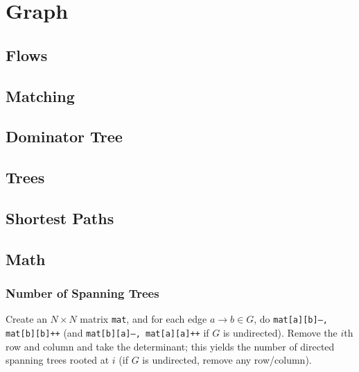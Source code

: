 \chapter{Graph}

\section{Flows}

\section{Matching}

\section{Dominator Tree}

\section{Trees}

\section{Shortest Paths}

\section{Math}
	\subsection{Number of Spanning Trees}
		Create an $N\times N$ matrix \texttt{mat}, and for each edge $a \rightarrow b \in G$, do
		\texttt{mat[a][b]--, mat[b][b]++} (and \texttt{mat[b][a]--, mat[a][a]++} if $G$ is undirected).
		Remove the $i$th row and column and take the determinant; this yields the number of directed spanning trees rooted at $i$
		(if $G$ is undirected, remove any row/column).

